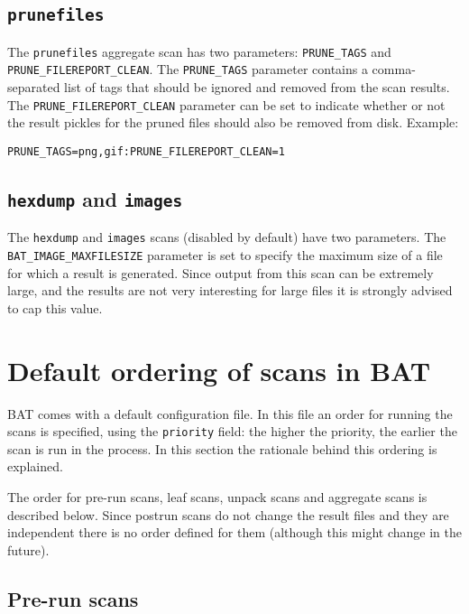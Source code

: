 \documentclass[10pt]{article}
\begin{document}
\subsection{\texttt{prunefiles}}

The \texttt{prunefiles} aggregate scan has two parameters: \texttt{PRUNE\_TAGS}
and \texttt{PRUNE\_FILEREPORT\_CLEAN}. The \texttt{PRUNE\_TAGS} parameter
contains a comma-separated list of tags that should be ignored and removed from
the scan results. The \texttt{PRUNE\_FILEREPORT\_CLEAN} parameter can be set to
indicate whether or not the result pickles for the pruned files should also be
removed from disk. Example:

\begin{verbatim}
PRUNE_TAGS=png,gif:PRUNE_FILEREPORT_CLEAN=1
\end{verbatim}

\subsection{\texttt{hexdump} and \texttt{images}}

The \texttt{hexdump} and \texttt{images} scans (disabled by default) have two
parameters. The \texttt{BAT\_IMAGE\_MAXFILESIZE} parameter is set to specify
the maximum size of a file for which a result is generated. Since output from
this scan can be extremely large, and the results are not very interesting for
large files it is strongly advised to cap this value.

\section{Default ordering of scans in BAT}

BAT comes with a default configuration file. In this file an order for running
the scans is specified, using the \texttt{priority} field: the higher the
priority, the earlier the scan is run in the process. In this section the
rationale behind this ordering is explained.

The order for pre-run scans, leaf scans, unpack scans and aggregate scans is
described below. Since postrun scans do not change the result files and they are
independent there is no order defined for them (although this might change in
the future).

\subsection{Pre-run scans}
\end{document}
